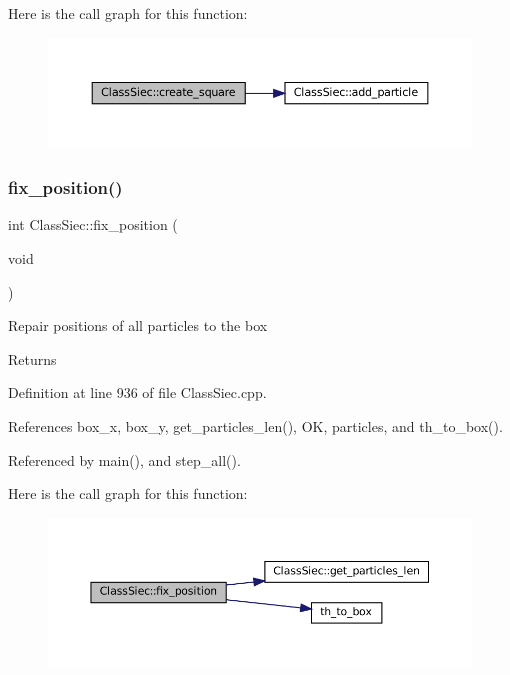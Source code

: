 Here is the call graph for this function\+:\nopagebreak
\begin{figure}[H]
\begin{center}
\leavevmode
\includegraphics[width=350pt]{classClassSiec_a4b34a96c2302a69832378955e515349c_cgraph}
\end{center}
\end{figure}
\mbox{\label{classClassSiec_a4527492cd521a36e1bcad1cb38034784}} 
\subsubsection{\texorpdfstring{fix\+\_\+position()}{fix\_position()}}
{\footnotesize\ttfamily int Class\+Siec\+::fix\+\_\+position (\begin{DoxyParamCaption}\item[{void}]{ }\end{DoxyParamCaption})}

Repair positions of all particles to the box \begin{DoxyReturn}{Returns}

\end{DoxyReturn}


Definition at line 936 of file Class\+Siec.\+cpp.



References box\+\_\+x, box\+\_\+y, get\+\_\+particles\+\_\+len(), OK, particles, and th\+\_\+to\+\_\+box().



Referenced by main(), and step\+\_\+all().

Here is the call graph for this function\+:\nopagebreak
\begin{figure}[H]
\begin{center}
\leavevmode
\includegraphics[width=350pt]{classClassSiec_a4527492cd521a36e1bcad1cb38034784_cgraph}
\end{center}
\end{figure}
\mbox{\label{classClassSiec_aa6e0a35a8b5387e43ee4f518ee101d74}} 
